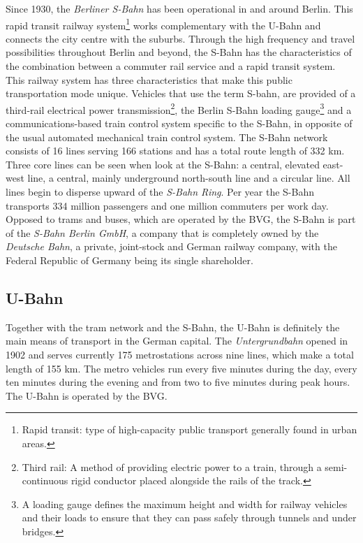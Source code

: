 Since 1930, the \textit{Berliner S-Bahn} has been operational in and around Berlin. This rapid transit railway system\footnote{Rapid transit: type of high-capacity public transport generally found in urban areas.} works complementary with the U-Bahn and connects the city centre with the suburbs. Through the high frequency and travel possibilities throughout Berlin and beyond, the S-Bahn has the characteristics of the combination between a commuter rail service and a rapid transit system. This railway system has three characteristics that make this public transportation mode unique. Vehicles that use the term S-bahn, are provided of a third-rail electrical power transmission\footnote{Third rail: A method of providing electric power to a train, through a semi-continuous rigid conductor placed alongside the rails of the track\cite{thirdRail}.}, the Berlin S-Bahn loading gauge\footnote{A loading gauge defines the maximum height and width for railway vehicles and their loads to ensure that they can pass safely through tunnels and under bridges\cite{gauge}.} and a communications-based train control system specific to the S-Bahn, in opposite of the usual automated mechanical train control system. The S-Bahn network consists of 16 lines serving 166 stations and has a total route length of 332 km. Three core lines can be seen when look at the S-Bahn: a central, elevated east-west line, a central, mainly underground north-south line and a circular line. All lines begin to disperse upward of the \textit{S-Bahn Ring}\cite{SBahn}. Per year the S-Bahn transports 334 million passengers and one million commuters per work day\cite{SBahnFIGURES}.\\ \newline
Opposed to trams and buses, which are operated by the BVG, the S-Bahn is part of the \textit{S-Bahn Berlin GmbH}, a company that is completely owned by the \textit{Deutsche Bahn}, a private, joint-stock and German railway company, with the Federal Republic of Germany being its single shareholder\cite{DB}.

\subsection{U-Bahn}

Together with the tram network and the S-Bahn, the U-Bahn is definitely the main means of transport in the German capital. The \textit{Untergrundbahn} opened in 1902 and serves currently 175 metrostations across nine lines, which make a total length of 155 km. The metro vehicles run every five minutes during the day, every ten minutes during the evening and from two to five minutes during peak hours. The U-Bahn is operated by the BVG\cite{UBahn}.

